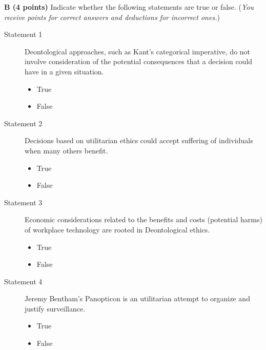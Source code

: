 \documentclass[12pt]{scrartcl}
\begin{document}
\vspace{0.3cm}
\newpage
\textbf{B (4 points)} Indicate whether the following statements are true or false. (\textit{You receive points for correct answers and deductions for incorrect ones.})
\\
\begin{description}
	\item[Statement 1] Deontological approaches, such as Kant's categorical imperative, do not involve consideration of the potential consequences that a decision could have in a given situation.

\begin{multicols}{2}
	\begin{itemize}[label={\Square}]
		\item True
		\item False
	\end{itemize}
\end{multicols}

\item[Statement 2] Decisions based on utilitarian ethics could accept suffering of individuals when many others benefit.

\begin{multicols}{2}
	\begin{itemize}[label={\Square}]
		\item True
		\item False
	\end{itemize}
\end{multicols}

\item[Statement 3] Economic considerations related to the benefits and costs (potential harms) of workplace technology are rooted in Deontological ethics.

\begin{multicols}{2}
	\begin{itemize}[label={\Square}]
		\item True
		\item False
	\end{itemize}
\end{multicols}

\item[Statement 4] Jeremy Bentham's Panopticon is an utilitarian attempt to organize and justify surveillance.

\begin{multicols}{2}
	\begin{itemize}[label={\Square}]
		\item True
		\item False
	\end{itemize}
\end{multicols}

\end{description}
\end{document}
